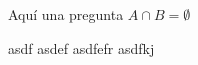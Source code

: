 \documentclass[10pt,a4paper]{exam}
\begin{document}
	\begin{questions}
	\question
		Aquí una pregunta $A\cap B =\emptyset$
		\begin{choices}
			\choice asdf
			\choice asdef
			\choice asdfefr
			\choice asdfkj
			\end{choices}
	\end{questions}
\end{document}
